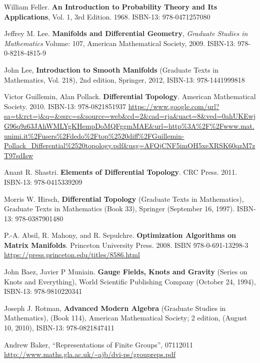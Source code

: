 \documentclass[10pt]{amsart}
\begin{document}
\begin{thebibliography}{9}

William Feller.  \textbf{An Introduction to Probability Theory and Its Applications}, Vol. 1, 3rd Edition.  1968.  ISBN-13: 978-0471257080



Jeffrey M. Lee. \textbf{Manifolds and Differential Geometry}, \emph{Graduate Studies in Mathematics} Volume: 107, American Mathematical Society, 2009. ISBN-13: 978-0-8218-4815-9

John Lee, \textbf{Introduction to Smooth Manifolds} (Graduate Texts in Mathematics, Vol. 218), 2nd edition, Springer,  2012, ISBN-13: 978-1441999818

Victor Guillemin, Alan Pollack. \textbf{Differential Topology}. American Mathematical Society. 2010. ISBN-13: 978-0821851937
\url{https://www.google.com/url?sa=t&rct=j&q=&esrc=s&source=web&cd=2&cad=rja&uact=8&ved=0ahUKEwjG96q9z63JAhWMLYgKHempDoMQFggmMAE&url=http\%3A\%2F\%2Fwww.mat.unimi.it\%2Fusers\%2Fdedo\%2Ftop\%2520diff\%2FGuillemin-Pollack_Differential\%2520topology.pdf&usg=AFQjCNF5imOH5xeXRSK60qzM7zT97sdIsw}

Anant R. Shastri. \textbf{Elements of Differential Topology}. CRC Press. 2011. ISBN-13: 978-0415339209

Morris W. Hirsch, \textbf{Differential Topology} (Graduate Texts in Mathematics), Graduate Texts in Mathematics (Book 33), Springer (September 16, 1997). ISBN-13: 978-0387901480

P.-A. Absil, R. Mahony, and R. Sepulchre.  \textbf{Optimization Algorithms on Matrix Manifolds}.  Princeton University Press.  2008.  ISBN 978-0-691-13298-3
\url{https://press.princeton.edu/titles/8586.html}  

John Baez, Javier P Muniain.  \textbf{Gauge Fields, Knots and Gravity} (Series on Knots and Everything), World Scientific Publishing Company (October 24, 1994), ISBN-13: 978-9810220341

Joseph J. Rotman, \textbf{Advanced Modern Algebra} (Graduate Studies in Mathematics), (Book 114), American Mathematical Society; 2 edition, (August 10, 2010), ISBN-13: 978-0821847411

Andrew Baker, ``Representations of Finite Groups'', 07112011
\url{http://www.maths.gla.ac.uk/~ajb/dvi-ps/groupreps.pdf}


\end{thebibliography}
\end{document}
